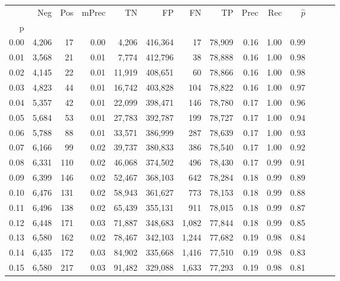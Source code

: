 \begin{tabular}{rrrrrrrrrrrrrr}
\toprule
{} &    Neg &    Pos & mPrec &       TN &       FP &      FN &      TP &  Prec &   Rec & $\hat{p}$ \\
p    &        &        &       &          &          &         &         &       &       &           \\
\midrule
0.00 &  4,206 &     17 &  0.00 &    4,206 &  416,364 &      17 &  78,909 &  0.16 &  1.00 &      0.99 \\
0.01 &  3,568 &     21 &  0.01 &    7,774 &  412,796 &      38 &  78,888 &  0.16 &  1.00 &      0.98 \\
0.02 &  4,145 &     22 &  0.01 &   11,919 &  408,651 &      60 &  78,866 &  0.16 &  1.00 &      0.98 \\
0.03 &  4,823 &     44 &  0.01 &   16,742 &  403,828 &     104 &  78,822 &  0.16 &  1.00 &      0.97 \\
0.04 &  5,357 &     42 &  0.01 &   22,099 &  398,471 &     146 &  78,780 &  0.17 &  1.00 &      0.96 \\
0.05 &  5,684 &     53 &  0.01 &   27,783 &  392,787 &     199 &  78,727 &  0.17 &  1.00 &      0.94 \\
0.06 &  5,788 &     88 &  0.01 &   33,571 &  386,999 &     287 &  78,639 &  0.17 &  1.00 &      0.93 \\
0.07 &  6,166 &     99 &  0.02 &   39,737 &  380,833 &     386 &  78,540 &  0.17 &  1.00 &      0.92 \\
0.08 &  6,331 &    110 &  0.02 &   46,068 &  374,502 &     496 &  78,430 &  0.17 &  0.99 &      0.91 \\
0.09 &  6,399 &    146 &  0.02 &   52,467 &  368,103 &     642 &  78,284 &  0.18 &  0.99 &      0.89 \\
0.10 &  6,476 &    131 &  0.02 &   58,943 &  361,627 &     773 &  78,153 &  0.18 &  0.99 &      0.88 \\
0.11 &  6,496 &    138 &  0.02 &   65,439 &  355,131 &     911 &  78,015 &  0.18 &  0.99 &      0.87 \\
0.12 &  6,448 &    171 &  0.03 &   71,887 &  348,683 &   1,082 &  77,844 &  0.18 &  0.99 &      0.85 \\
0.13 &  6,580 &    162 &  0.02 &   78,467 &  342,103 &   1,244 &  77,682 &  0.19 &  0.98 &      0.84 \\
0.14 &  6,435 &    172 &  0.03 &   84,902 &  335,668 &   1,416 &  77,510 &  0.19 &  0.98 &      0.83 \\
0.15 &  6,580 &    217 &  0.03 &   91,482 &  329,088 &   1,633 &  77,293 &  0.19 &  0.98 &      0.81 \\

\end{tabular}
